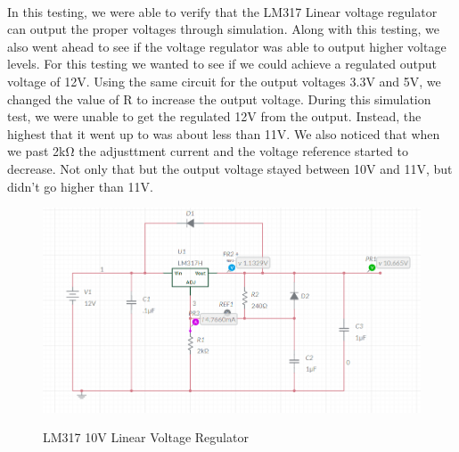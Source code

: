 \paragraph{}In this testing, we were able to verify that the LM317 Linear voltage regulator can output the proper voltages through simulation. Along with this testing, we also went ahead to see if the voltage regulator was able to output higher voltage levels. For this testing we wanted to see if we could achieve a regulated output voltage of 12V. Using the same circuit for the output voltages 3.3V and 5V, we changed the value of R to increase the output voltage. During this simulation test, we were unable to get the regulated 12V from the output. Instead, the highest that it went up to was about less than 11V. We also noticed that when we past 2kΩ the adjusttment current and the voltage reference started to decrease. Not only that but the output voltage stayed between 10V and 11V, but didn't go higher than 11V.
\begin{figure}[H]
    \centering
    \caption{LM317 10V Linear Voltage Regulator}
    \includegraphics[width=\textwidth]{images/LM317_10_schematic.png}
    \label{fig:10V-linear-voltage-regulator}
\end{figure}
